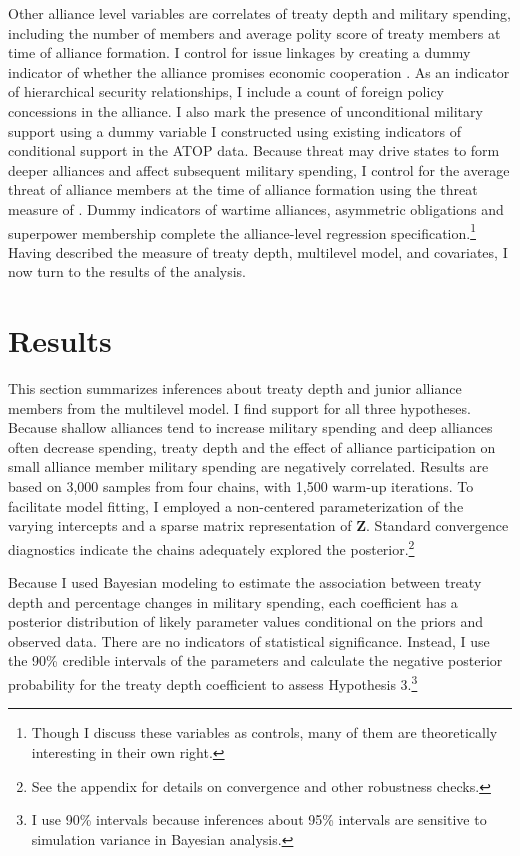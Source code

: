 \documentclass[12pt]{article}
\begin{document}
 
Other alliance level variables are correlates of treaty depth and military spending, including the number of members and average polity score of treaty members at time of alliance formation. 
I control for issue linkages by creating a dummy indicator of whether the alliance promises economic cooperation \citep{Poast2013, LongLeeds2006}. 
As an indicator of hierarchical security relationships, I include a count of foreign policy concessions in the alliance. 
I also mark the presence of unconditional military support using a dummy variable I constructed using existing indicators of conditional support in the ATOP data. 
Because threat may drive states to form deeper alliances and affect subsequent military spending, I control for the average threat of alliance members at the time of alliance formation using the threat measure of \citet{LeedsSavun2007}. 
Dummy indicators of wartime alliances, asymmetric obligations \citep{Leedsetal2002} and superpower membership complete the alliance-level regression specification.\footnote{Though I discuss these variables as controls, many of them are theoretically interesting in their own right.}  
Having described the measure of treaty depth, multilevel model, and covariates, I now turn to the results of the analysis. 

 

\section{Results}


This section summarizes inferences about treaty depth and junior alliance members from the multilevel model. 
I find support for all three hypotheses. 
Because shallow alliances tend to increase military spending and deep alliances often decrease spending, treaty depth and the effect of alliance participation on small alliance member military spending are negatively correlated. 
Results are based on 3,000 samples from four chains, with 1,500 warm-up iterations. 
To facilitate model fitting, I employed a non-centered parameterization of the varying intercepts and a sparse matrix representation of \textbf{Z}. 
Standard convergence diagnostics indicate the chains adequately explored the posterior.\footnote{See the appendix for details on convergence and other robustness checks.} 


Because I used Bayesian modeling to estimate the association between treaty depth and percentage changes in military spending, each coefficient has a posterior distribution of likely parameter values conditional on the priors and observed data.
There are no indicators of statistical significance. 
Instead, I use the 90\% credible intervals of the parameters and calculate the negative posterior probability for the treaty depth coefficient to assess Hypothesis 3.\footnote{I use 90\% intervals because inferences about 95\% intervals are sensitive to simulation variance in Bayesian analysis.}
\end{document}
